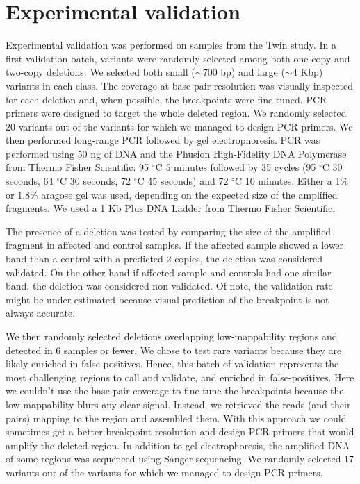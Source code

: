 \section*{Experimental validation}
Experimental validation was performed on samples from the Twin study.
In a first validation batch, variants were randomly selected among both one-copy and two-copy deletions.
We selected both small ($\sim700$ bp) and large ($\sim4$ Kbp) variants in each class.
The coverage at base pair resolution was visually inspected for each deletion and, when possible, the breakpoints were fine-tuned.
PCR primers were designed to target the whole deleted region.
We randomly selected 20 variants out of the variants for which we managed to design PCR primers.
We then performed long-range PCR followed by gel electrophoresis.
PCR was performed using 50 ng of DNA and the Phusion High-Fidelity DNA Polymerase from Thermo Fisher Scientific: 95 $^{\circ}$C 5 minutes followed by 35 cycles (95 $^{\circ}$C 30 seconds, 64 $^{\circ}$C 30 seconds, 72 $^{\circ}$C 45 seconds) and 72 $^{\circ}$C 10 minutes.
Either a 1\% or 1.8\% aragose gel was used, depending on the expected size of the amplified fragments.
We used a 1 Kb Plus DNA Ladder from Thermo Fisher Scientific.

The presence of a deletion was tested by comparing the size of the amplified fragment in affected and control samples.
If the affected sample showed a lower band than a control with a predicted 2 copies, the deletion was considered validated.
On the other hand if affected sample and controls had one similar band, the deletion was considered non-validated.
Of note, the validation rate might be under-estimated because visual prediction of the breakpoint is not always accurate.

We then randomly selected deletions overlapping low-mappability regions and detected in 6 samples or fewer.
We chose to test rare variants because they are likely enriched in false-positives.
Hence, this batch of validation represents the most challenging regions to call and validate, and enriched in false-positives.
Here we couldn't use the base-pair coverage to fine-tune the breakpoints because the low-mappability blurs any clear signal.
Instead, we retrieved the reads (and their pairs) mapping to the region and assembled them.
With this approach we could sometimes get a better breakpoint resolution and design PCR primers that would amplify the deleted region.
In addition to gel electrophoresis, the amplified DNA of some regions was sequenced using Sanger sequencing.
We randomly selected 17 variants out of the variants for which we managed to design PCR primers.

